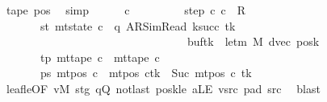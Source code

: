 \begin{isabellebody}
\ tape{}\ pos{}\ \isamarkupfalse%
\ simp\isanewline
\ \ \ \ \isamarkupfalse%
\ c{\isacharprime}{\kern0pt}{\isacharprime}{\kern0pt}\ \isanewline
\ \ \ \ \ \ \ \ step{\isacharcolon}{\kern0pt}\ {\isachardoublequoteopen}{\isacharparenleft}{\kern0pt}c{\isacharprime}{\kern0pt}{\isacharcomma}{\kern0pt}\ c{\isacharprime}{\kern0pt}{\isacharprime}{\kern0pt}{\isacharparenright}{\kern0pt}\ {\isasymin}\ R{\isacharprime}{\kern0pt}{\isachardoublequoteclose}\isanewline
\ \ \ \ \ \ \ st{\isacharcolon}{\kern0pt}\ {\isachardoublequoteopen}mt{\isacharunderscore}{\kern0pt}state\ c{\isacharprime}{\kern0pt}{\isacharprime}{\kern0pt}\ {\isacharequal}{\kern0pt}\ {\isacharparenleft}{\kern0pt}q{\isacharcomma}{\kern0pt}\ AR{\isacharunderscore}{\kern0pt}SimRead{\isacharcomma}{\kern0pt}\ k{\isacharunderscore}{\kern0pt}succ\ tk{\isacharcomma}{\kern0pt}\ {}{\isacharcomma}{\kern0pt}\isanewline
\ \ \ \ \ \ \ \ \ \ \ \ \ \ \ \ \ \ \ \ \ \ \ \ \ \ \ \ \ \ \ \ \ buf{\isacharparenleft}{\kern0pt}tk\ {\isacharcolon}{\kern0pt}{\isacharequal}{\kern0pt}\ le{\isacharunderscore}{\kern0pt}tm\ M{\isacharparenright}{\kern0pt}{\isacharcomma}{\kern0pt}\ dvec{\isacharcomma}{\kern0pt}\ posk{\isacharparenright}{\kern0pt}{\isachardoublequoteclose}\isanewline
\ \ \ \ \ \ \ tp{\isacharcolon}{\kern0pt}\ {\isachardoublequoteopen}mt{\isacharunderscore}{\kern0pt}tape\ c{\isacharprime}{\kern0pt}{\isacharprime}{\kern0pt}\ {\isacharequal}{\kern0pt}\ mt{\isacharunderscore}{\kern0pt}tape\ c{\isacharprime}{\kern0pt}{\isachardoublequoteclose}\isanewline
\ \ \ \ \ \ \ ps{\isacharcolon}{\kern0pt}\ {\isachardoublequoteopen}mt{\isacharunderscore}{\kern0pt}pos\ c{\isacharprime}{\kern0pt}{\isacharprime}{\kern0pt}\ {\isacharequal}{\kern0pt}\ {\isacharparenleft}{\kern0pt}mt{\isacharunderscore}{\kern0pt}pos\ c{\isacharprime}{\kern0pt}{\isacharparenright}{\kern0pt}{\isacharparenleft}{\kern0pt}tk\ {\isacharcolon}{\kern0pt}{\isacharequal}{\kern0pt}\ Suc\ {\isacharparenleft}{\kern0pt}mt{\isacharunderscore}{\kern0pt}pos\ c{\isacharprime}{\kern0pt}\ tk{\isacharparenright}{\kern0pt}{\isacharparenright}{\kern0pt}{\isachardoublequoteclose}\isanewline
\ \ \ \ \ \ \isamarkupfalse%
\ leaf{\isacharunderscore}{\kern0pt}le{\isacharbrackleft}{\kern0pt}OF\ vM\ stg\ qQ\ notlast\ posk{\isacharunderscore}{\kern0pt}le\ aLE\ vsrc\ pad{}\ src{}{\isacharbrackright}{\kern0pt}\ \isamarkupfalse%
\ blast\isanewline
\ \ \ \ \isamarkupfalse%

\end{isabellebody}
